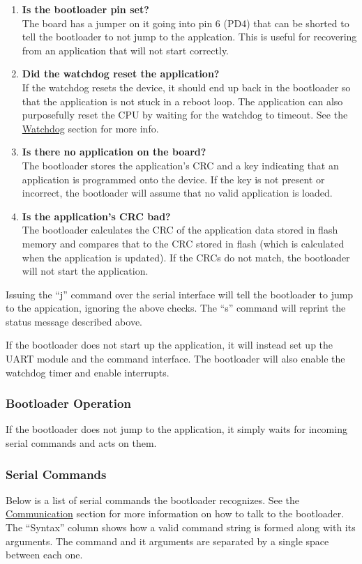 \documentclass{article}
\begin{document}
\begin{enumerate}
  \item \textbf{Is the bootloader pin set?} \\
    The board has a jumper on it going into pin 6 (PD4) that can be shorted to tell the bootloader
    to not jump to the applcation.  This is useful for recovering from an application that will
    not start correctly.
  \item \textbf{Did the watchdog reset the application?} \\
    If the watchdog resets the device, it should end up back in the bootloader so that the
    application is not stuck in a reboot loop.  The application can also purposefully reset the
    CPU by waiting for the watchdog to timeout.  See the \hyperref[ssec:FWWatchdog]{Watchdog}
    section for more info.
  \item \textbf{Is there no application on the board?} \\
    The bootloader stores the application's CRC and a key indicating that an application is
    programmed onto the device.  If the key is not present or incorrect, the bootloader will
    assume that no valid application is loaded.
  \item \textbf{Is the application's CRC bad?} \\
    The bootloader calculates the CRC of the application data stored in flash memory and compares
    that to the CRC stored in flash (which is calculated when the application is updated).  If the
    CRCs do not match, the bootloader will not start the application.
\end{enumerate}

Issuing the ``j'' command over the serial interface will tell the bootloader to jump to the
appication, ignoring the above checks.  The ``s'' command will reprint the status message described
above.

If the bootloader does not start up the application, it will instead set up the UART module and the
command interface.  The bootloader will also enable the watchdog timer and enable interrupts.

\subsubsection{Bootloader Operation} \label{sssec:FWBootOperation}
If the bootloader does not jump to the application, it simply waits for incoming serial commands and
acts on them.

\subsubsection{Serial Commands} \label{sssec:FWBootCommands}
Below is a list of serial commands the bootloader recognizes.  See the
\hyperref[ssec:FWComm]{Communication} section for more information on how to talk to the
bootloader. The ``Syntax'' column shows how a valid command string is formed along with its
arguments. The command and it arguments are separated by a single space between each one.
\end{document}
